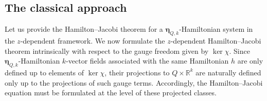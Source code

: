 \documentclass[11pt,twoside]{article}
\theoremstyle{plain}
\theoremstyle{definition}
\theoremstyle{remark}
\begin{document}
\subsection{The classical approach}
\label{sec:zdepclassical}

Let us provide the Hamilton--Jacobi theorem for a \({\bm \eta}_{Q,k}\)-Hamiltonian system in the \(z\)-dependent framework. We now formulate the \(z\)-dependent Hamilton--Jacobi theorem intrinsically with respect to the gauge freedom given by \(\ker\chi\). Since \({\bm \eta}_{Q,k}\)-Hamiltonian \(k\)-vector fields associated with the same Hamiltonian \(h\) are only defined up to elements of \(\ker\chi\), their projections to \(Q\times \mathbb R^k\) are naturally defined only up to the projections of such gauge terms. Accordingly, the Hamilton--Jacobi equation must be formulated at the level of these projected classes.
\end{document}
